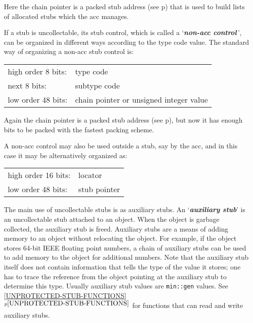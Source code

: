 \documentclass[12pt]{article}
\newcommand{\key}[1]{{\bf \em #1}\index{#1}}
\newcommand{\itemref}[1]{\ref{#1}$^{p\pageref{#1}}$}
\newcommand{\pagref}[1]{p\pageref{#1}}
\begin{document}
Here the chain pointer is a packed stub address
(see \pagref{STUB-ADDRESS-PACKING})
that is used to build lists of allocated stubs which
the acc manages.

If a stub is uncollectable, its stub control, which is called
a `\key{non-acc control}\,', can be organized in different
ways according to the type code value.  The standard way of organizing
a non-acc stub control is:

\begin{center}
\begin{tabular}{ll}
high order 8 bits:	& type code \\
next 8 bits:		& subtype code \\
low order 48 bits:	& chain pointer or unsigned integer value \\
\end{tabular}
\end{center}

Again the chain pointer is a packed stub address
(see \pagref{STUB-ADDRESS-PACKING}),
but now it has enough bits to be packed with the fastest packing scheme.

A non-acc control may also be used outside a stub, say by the acc, and
in this case it may be alternatively organized as:

\begin{center}
\begin{tabular}{ll}
high order 16 bits:	& locator \\
low order 48 bits:	& stub pointer \\
\end{tabular}
\end{center}

The main use of uncollectable stubs is as auxiliary stubs.
An `\key{auxiliary stub}' is an uncollectable stub attached to an object.
When the object is garbage collected, the auxiliary stub is freed.  Auxiliary
stubs are a means of adding memory to an object without relocating the object.
For example, if the object stores 64-bit IEEE floating point numbers,
a chain of auxiliary stubs can be used to add memory to the object
for additional numbers.  Note that the auxiliary stub itself does not
contain information that tells the type of the value it stores;
one has to trace the reference from the object pointing at the
auxiliary stub to determine this type.  Usually auxiliary stub
values are \verb|min::gen| values.  See \itemref{UNPROTECTED-STUB-FUNCTIONS}
for functions that can read and write auxiliary stubs.
\end{document}
